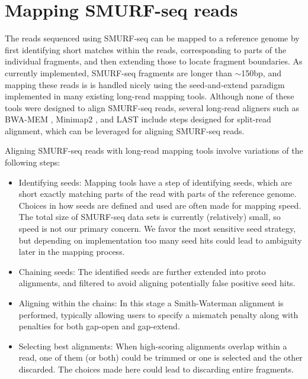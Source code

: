 \section{Mapping SMURF-seq reads}
The reads sequenced using SMURF-seq can be mapped to a reference genome
by first identifying short matches within the reads, corresponding to
parts of the individual fragments, and then extending those to locate
fragment boundaries.
%
As currently implemented, SMURF-seq fragments are longer than
$\sim$150bp, and mapping these reads is is handled nicely using the
seed-and-extend paradigm implemented in many existing long-read mapping
tools. 
%
Although none of these tools were designed to align SMURF-seq reads,
several long-read aligners such as BWA-MEM \cite{li2013aligning},
Minimap2 \cite{li2018minimap2}, and LAST \cite{kielbasa2011adaptive}
include steps designed for split-read alignment, which can be leveraged
for aligning SMURF-seq reads.

Aligning SMURF-seq reads with long-read mapping tools involve variations
of the following steps:
\begin{itemize}
\item Identifying seeds: Mapping tools have a step of identifying seeds,
  which are short exactly matching parts of the read with parts of the
  reference genome. Choices in how seeds are defined and used are often
  made for mapping speed. The total size of SMURF-seq data sets is
  currently (relatively) small, so speed is not our primary concern. We
  favor the most sensitive seed strategy, but depending on implementation
  too many seed hits could lead to ambiguity later in the mapping process.
\item Chaining seeds: The identified seeds are further extended into
  proto alignments, and filtered to avoid aligning potentially false
  positive seed hits.
\item Aligning within the chains: In this stage a Smith-Waterman
  alignment is performed, typically allowing users to specify a mismatch
  penalty along with penalties for both gap-open and gap-extend.
\item Selecting best alignments: When high-scoring alignments overlap
  within a read, one of them (or both) could be trimmed or one is selected
  and the other discarded. The choices made here could lead to discarding
  entire fragments.
\end{itemize}

